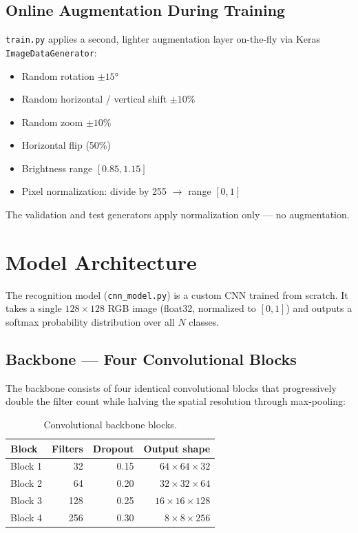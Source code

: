 \documentclass[12pt,a4paper]{article}
\begin{document}
\subsection{Online Augmentation During Training}

\texttt{train.py} applies a second, lighter augmentation layer on-the-fly via Keras \texttt{ImageDataGenerator}:

\begin{itemize}[noitemsep]
  \item Random rotation $\pm15°$
  \item Random horizontal / vertical shift $\pm10\%$
  \item Random zoom $\pm10\%$
  \item Horizontal flip (50\%)
  \item Brightness range $[0.85, 1.15]$
  \item Pixel normalization: divide by 255 $\rightarrow$ range $[0, 1]$
\end{itemize}

The validation and test generators apply normalization only — no augmentation.

\section{Model Architecture}

The recognition model (\texttt{cnn\_model.py}) is a custom CNN trained from scratch. It takes a single $128 \times 128$ RGB image (float32, normalized to $[0,1]$) and outputs a softmax probability distribution over all $N$ classes.

\subsection{Backbone — Four Convolutional Blocks}

The backbone consists of four identical convolutional blocks that progressively double the filter count while halving the spatial resolution through max-pooling:

\begin{table}[H]
  \centering
  \begin{tabular}{lrrr}
    \toprule
    \textbf{Block} & \textbf{Filters} & \textbf{Dropout} & \textbf{Output shape} \\
    \midrule
    Block 1 & 32  & 0.15 & $64 \times 64 \times 32$ \\
    Block 2 & 64  & 0.20 & $32 \times 32 \times 64$ \\
    Block 3 & 128 & 0.25 & $16 \times 16 \times 128$ \\
    Block 4 & 256 & 0.30 & $8 \times 8 \times 256$ \\
    \bottomrule
  \end{tabular}
  \caption{Convolutional backbone blocks.}
\end{table}
\end{document}
